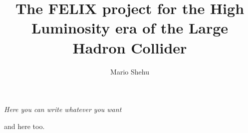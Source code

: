 \documentclass{styles/tthesis}
\title{The FELIX project for the High Luminosity era of the Large Hadron Collider}
\author{Mario Shehu}
\begin{document}


\printfrontpage




\chapter*{\mbox{}}

\begin{flushright}
\thispagestyle{empty}
\null{}
{\it Here you can write whatever you want

\vspace{10pt}
and here too.
}
\null
\end{flushright}
%
\thispagestyle{empty}
\mbox{}
\newpage





\tableofcontents
\listoffigures
\listoftables

\mainmatter

% 
% 
% 
% 
% 
% 
% 










\appendix



\printbibliography
\end{document}
